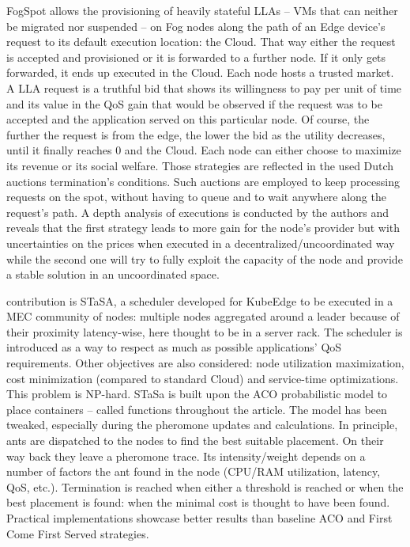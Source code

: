 \documentclass[11pt]{sdm}
\begin{document}
\begin{description}[leftmargin=10pt]
	\item[\citeposs{tasiopoulos_fogspot_2019}] FogSpot allows the provisioning of heavily stateful \glspl{LLA} -- \glspl{VM} that can neither be migrated nor suspended -- on Fog nodes along the path of an Edge device's request to its default execution location: the Cloud. That way either the request is accepted and provisioned or it is forwarded to a further node. If it only gets forwarded, it ends up executed in the Cloud.
		Each node hosts a trusted market. A \gls{LLA} request is a truthful bid that shows its willingness to pay per unit of time and its value in the \gls{QoS} gain that would be observed if the request was to be accepted and the application served on this particular node. Of course, the further the request is from the edge, the lower the bid as the utility decreases, until it finally reaches 0 and the Cloud.
		Each node can either choose to maximize its revenue or its social welfare. Those strategies are reflected in the used Dutch auctions termination's conditions. Such auctions are employed to keep processing requests on the spot, without having to queue and to wait anywhere along the request's path. A depth analysis of executions is conducted by the authors and reveals that the first strategy leads to more gain for the node's provider but with uncertainties on the prices when executed in a decentralized/uncoordinated way while the second one will try to fully exploit the capacity of the node and provide a stable solution in an uncoordinated space.

	\item[\citeposs{mutichiro_qos-based_2021}] contribution is STaSA, a scheduler developed for KubeEdge to be executed in a \gls{MEC} community of nodes: multiple nodes aggregated around a leader because of their proximity latency-wise, here thought to be in a server rack. The scheduler is introduced as a way to respect as much as possible applications' \gls{QoS} requirements. Other objectives are also considered: node utilization maximization, cost minimization (compared to standard Cloud) and service-time optimizations. This problem is NP-hard. STaSa is built upon the \gls{ACO} probabilistic model to place containers -- called functions throughout the article. The model has been tweaked, especially during the pheromone updates and calculations. In principle, ants are dispatched to the nodes to find the best suitable placement. On their way back they leave a pheromone trace. Its intensity/weight depends on a number of factors the ant found in the node (CPU/RAM utilization, latency, \gls{QoS}, etc.). Termination is reached when either a threshold is reached or when the best placement is found: when the minimal cost is thought to have been found. Practical implementations showcase better results than baseline \gls{ACO} and First Come First Served strategies.


\end{description}
\end{document}
